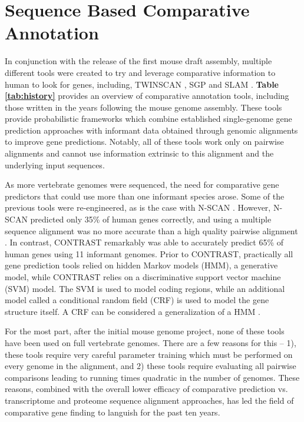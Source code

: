 \documentclass[fleqn,10pt]{wlscirep}
\begin{document}
\section*{Sequence Based Comparative Annotation}

In conjunction with the release of the first mouse draft assembly\cite{waterston2002initial}, multiple different tools were created to try and leverage comparative information to human to look for genes, including, TWINSCAN \cite{flicek2003leveraging}, SGP \cite{wiehe2001sgp} and SLAM \cite{alexandersson2003slam}. \textbf{Table \ref{tab:history}} provides an overview of comparative annotation tools, including those written in the years following the mouse genome assembly. These tools provide probabilistic frameworks which combine established single-genome gene prediction approaches \cite{yeh2001computational,gelfand1996gene} with informant data obtained through genomic alignments to improve gene predictions. Notably, all of these tools work only on pairwise alignments and cannot use information extrinsic to this alignment and the underlying input sequences.

As more vertebrate genomes were sequenced, the need for comparative gene predictors that could use more than one informant species arose. Some of the previous tools were re-engineered, as is the case with N-SCAN \cite{gross2006using,van2007using}. However, N-SCAN predicted only 35\% of human genes correctly, and using a multiple sequence alignment was no more accurate than a high quality pairwise alignment \cite{flicek2007gene}. In contrast, CONTRAST \cite{gross2007contrast} remarkably was able to accurately predict 65\% of human genes using 11 informant genomes. Prior to CONTRAST, practically all gene prediction tools relied on hidden Markov models (HMM), a generative model, while CONTRAST relies on a discriminative support vector machine (SVM) model. The SVM is used to model coding regions, while an additional model called a conditional random field (CRF) is used to model the gene structure itself. A CRF can be considered a generalization of a HMM \cite{lafferty2001conditional}.

For the most part, after the initial mouse genome project, none of these tools have been used on full vertebrate genomes. There are a few reasons for this -- 1), these tools require very careful parameter training which must be performed on every genome in the alignment, and 2) these tools require evaluating all pairwise comparisons leading to running times quadratic in the number of genomes. These reasons, combined with the overall lower efficacy of comparative prediction vs. transcriptome and proteome sequence alignment approaches, has led the field of comparative gene finding to languish for the past ten years.
\end{document}
